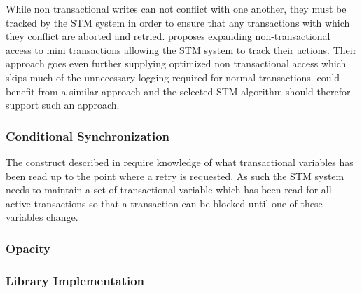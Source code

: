 While non transactional writes can not conflict with one another, they must be tracked by the \ac{STM} system in order to ensure that any transactions with which they conflict are aborted and retried. \cite{hindman2006atomicity} proposes expanding non-transactional access to mini transactions allowing the \ac{STM} system to track their actions. Their approach goes even further supplying optimized non transactional access which skips much of the unnecessary logging required for normal transactions. \stmnamesp could benefit from a similar approach and the selected \ac{STM} algorithm should therefor support such an approach.
 
\subsubsection{Conditional Synchronization}
The  construct described in  require knowledge of what transactional variables has been read up to the point where a retry is requested. As such the \ac{STM} system needs to maintain a set of transactional variable which has been read for all active transactions so that a transaction can be blocked until one of these variables change.
\subsubsection{Opacity}
\subsubsection{Library Implementation}

